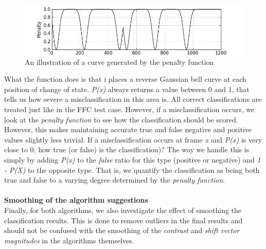 \documentclass[12pt]{article}
\begin{document}
%
\begin{figure}
\includegraphics[width=1\textwidth]{img/penaltyfunction.jpg}
\caption{An illustration of a curve generated by the penalty function}
\end{figure}
%
What the function does is that i places a reverse Gaussian bell curve at each position of change of state. \emph{P(x)} always returns a value between 0 and 1, that tells us how severe a misclassification in this area is. All correct classifications are treated just like in the FFC test case. However, if a misclassification occurs, we look at the \textit{penalty function} to see how the classification should be scored. However, this makes maintaining accurate true and false negative and positive values slightly less trivial. If a misclassification occurs at frame \textit{x} and \emph{P(x)} is very close to 0, how true (or false) is the classification)? The way we handle this is simply by adding \textit{P(x)} to the \textit{false} ratio for this type (positive or negative) and \textit{1 - P(X)} to the opposite type. That is, we quantify the classification as being both true and false to a varying degree determined by the \textit{penalty function}.\\\\
%
\textbf{Smoothing of the algorithm suggestions}\\
%
Finally, for both algorithms, we also investigate the effect of smoothing the classification results. This is done to remove outliers in the final results and should not be confused with the smoothing of the \textit{contrast} and \textit{shift vector magnitudes} in the algorithms themselves.
%
\end{document}
